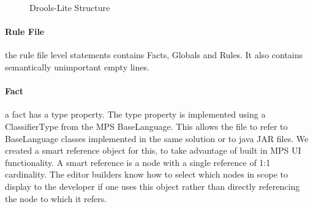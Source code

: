 \begin{figure}[htbp]
    \centering
    \caption{Drools-Lite Structure}
    \label{fig:DroolsLiteDiagram}
\end{figure}
 
\paragraph{Rule File} the rule file level statements contains Facts, Globals and Rules.
It also contains semantically unimportant empty lines.

\paragraph{Fact} a fact has a type property.
The type property is implemented using a ClassifierType from the MPS BaseLanguage.
This allows the file to refer to BaseLanguage classes implemented in the same solution or to java JAR files.
We created a smart reference object for this, to take advantage of built in MPS UI functionality.
A smart reference is a node with a single reference of 1:1 cardinality.
The editor builders know how to select which nodes in scope to display to the developer if one uses this object rather than directly referencing the node to which it refers.

